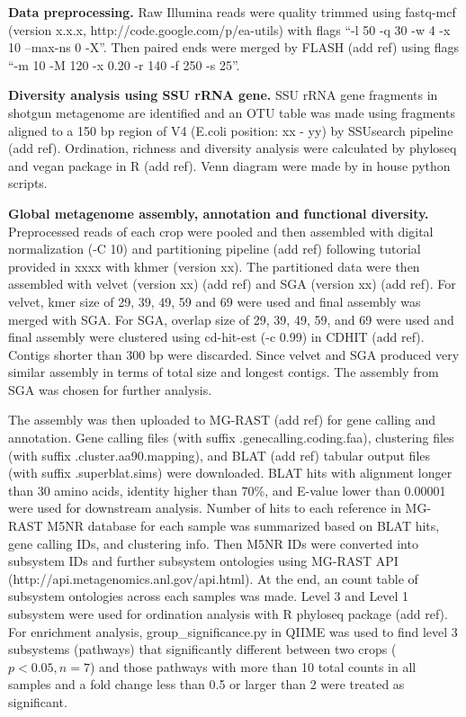 \documentclass[12pt]{article}
\begin{document}
{\bf Data preprocessing.}
Raw Illumina reads were quality trimmed using fastq-mcf (version x.x.x, http://code.google.com/p/ea-utils) with flags ``-l 50 -q 30 -w 4 -x 10 --max-ns 0 -X''. Then paired ends were merged by FLASH (add ref) using flags ``-m 10 -M 120 -x 0.20 -r 140 -f 250 -s 25''.

{\bf Diversity analysis using SSU rRNA gene.}
SSU rRNA gene fragments in shotgun metagenome are identified and an OTU table was made using fragments aligned to a 150 bp region of V4 (E.coli position: xx - yy) by SSUsearch pipeline (add ref). Ordination, richness and diversity analysis were calculated by phyloseq and vegan package in R (add ref). Venn diagram were made by in house python scripts.

{\bf Global metagenome assembly, annotation and functional diversity.}
Preprocessed reads of each crop were pooled and then assembled with digital normalization (-C 10) and partitioning pipeline (add ref) following tutorial provided in xxxx with khmer (version xx). The partitioned data were then assembled with velvet (version xx) (add ref) and SGA (version xx) (add ref). For velvet, kmer size of 29, 39, 49, 59 and 69 were used and final assembly was merged with SGA. For SGA, overlap size of 29, 39, 49, 59, and 69 were used and final assembly were clustered using cd-hit-est (-c 0.99) in CDHIT (add ref). Contigs shorter than 300 bp were discarded. Since velvet and SGA produced very similar assembly in terms of total size and longest contigs. The assembly from SGA was chosen for further analysis.

The assembly was then uploaded to MG-RAST (add ref) for gene calling and annotation. Gene calling files (with suffix .genecalling.coding.faa), clustering files (with suffix .cluster.aa90.mapping), and BLAT (add ref) tabular output files (with suffix .superblat.sims) were downloaded. BLAT hits with alignment longer than 30 amino acids, identity higher than 70\%, and E-value lower than 0.00001 were used for downstream analysis. Number of hits to each reference in MG-RAST M5NR database for each sample was summarized based on BLAT hits, gene calling IDs, and clustering info. Then M5NR IDs were converted into subsystem IDs and further subsystem ontologies using MG-RAST API (http://api.metagenomics.anl.gov/api.html). At the end, an count table of subsystem ontologies across each samples was made. Level 3 and Level 1 subsystem were used for ordination analysis with R phyloseq package (add ref). For enrichment analysis, group\_significance.py in QIIME was used to find level 3 subsystems (pathways) that significantly different between two crops ($p < 0.05, n = 7$) and those pathways with more than 10 total counts in all samples and a fold change less than 0.5 or larger than 2 were treated as significant.
\end{document}
